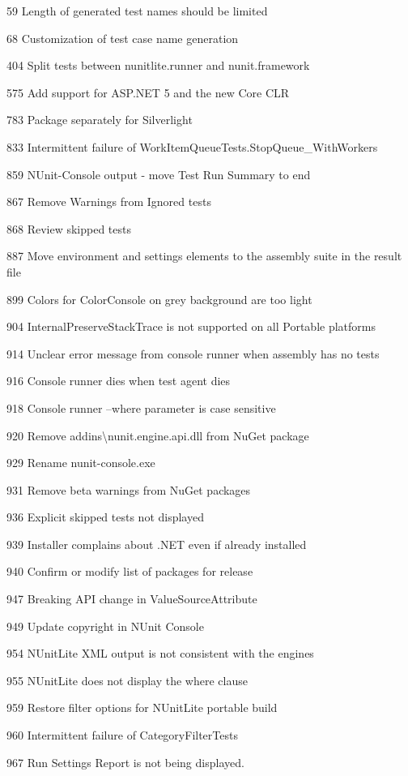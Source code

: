 \begin{DoxyItemize}
\item 59 Length of generated test names should be limited
\item 68 Customization of test case name generation
\item 404 Split tests between nunitlite.\+runner and nunit.\+framework
\item 575 Add support for A\+S\+P.\+N\+ET 5 and the new Core C\+LR
\item 783 Package separately for Silverlight
\item 833 Intermittent failure of Work\+Item\+Queue\+Tests.\+Stop\+Queue\+\_\+\+With\+Workers
\item 859 N\+Unit-\/\+Console output -\/ move Test Run Summary to end
\item 867 Remove Warnings from Ignored tests
\item 868 Review skipped tests
\item 887 Move environment and settings elements to the assembly suite in the result file
\item 899 Colors for Color\+Console on grey background are too light
\item 904 Internal\+Preserve\+Stack\+Trace is not supported on all Portable platforms
\item 914 Unclear error message from console runner when assembly has no tests
\item 916 Console runner dies when test agent dies
\item 918 Console runner --where parameter is case sensitive
\item 920 Remove addins\textbackslash{}nunit.\+engine.\+api.\+dll from Nu\+Get package
\item 929 Rename nunit-\/console.\+exe
\item 931 Remove beta warnings from Nu\+Get packages
\item 936 Explicit skipped tests not displayed
\item 939 Installer complains about .N\+ET even if already installed
\item 940 Confirm or modify list of packages for release
\item 947 Breaking A\+PI change in Value\+Source\+Attribute
\item 949 Update copyright in N\+Unit Console
\item 954 N\+Unit\+Lite X\+ML output is not consistent with the engine\textquotesingle{}s
\item 955 N\+Unit\+Lite does not display the where clause
\item 959 Restore filter options for N\+Unit\+Lite portable build
\item 960 Intermittent failure of Category\+Filter\+Tests
\item 967 Run Settings Report is not being displayed.
\end{DoxyItemize}

